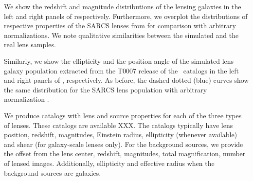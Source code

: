 \documentclass[useAMS,usenatbib,a4paper]{mn2e}
\begin{document}
We show the redshift and magnitude distributions of the lensing galaxies in the
left and right panels of 
respectively. Furthermore, we overplot the distributions of respective
properties of the SARCS lenses from \citep{More2012} for comparison with arbitrary
normalizations. We note qualitative similarities between the simulated and the
real lens samples.

Similarly, we show the ellipticity and the position angle of the simulated lens
galaxy population extracted from the T0007 release of the \cfhtls~catalogs in the
left and right panels of , respectively. As before, the
dashed-dotted (blue) curves show the same distribution for the SARCS lens
population with arbitrary normalization \citep{More2012}.


We produce catalogs with lens and source properties for each of the three types
of lenses. These catalogs are available XXX. The catalogs typically have lens
position, redshift, magnitudes, Einstein radius, ellipticity (whenever
available) and shear (for galaxy-scale lenses only). For the background
sources, we provide the offset from the lens center, redshift, magnitudes,
total magnification, number of lensed images. Additionally, ellipticity and
effective radius when the background sources are galaxies.
\end{document}
